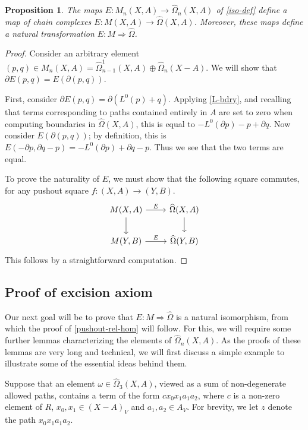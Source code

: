 \documentclass[11pt]{article}
\newtheorem{proposition}[theo]{Proposition}
\theoremstyle{definition}
\numberwithin{equation}{section}
\newcommand{\tOmega}{\widehat{\Omega}}
\newcommand{\tOmegaOne}{\widehat{\Omega}^1}
\newcommand{\bd}{\partial}
\begin{document}
\begin{proposition}\label{iso-pres-bdry}
The maps $E \colon M_n(X,A) \to \tOmega_n(X,A)$ of \cref{iso-def} define a map of chain complexes $E \colon M(X,A) \to \tOmega(X,A)$. Moreover, these maps define a natural transformation $E \colon M \Rightarrow \tOmega$.
\end{proposition}

\begin{proof}
Consider an arbitrary element $(p,q) \in M_n(X,A) = \tOmegaOne_{n-1}(X,A) \oplus \tOmega_{n}(X-A)$. We will show that $\bd E(p,q) = E(\bd(p,q))$.

First, consider $\bd E(p,q) = \bd(L^0(p) + q)$. Applying \cref{L-bdry}, and recalling that terms corresponding to paths contained entirely in $A$ are set to zero when computing boundaries in $\tOmega(X,A)$, this is equal to $-L^0(\bd p) - p + \bd q$. Now consider $E(\bd(p,q))$; by definition, this is $E(-\bd p, \bd q - p) = -L^0(\bd p) + \bd q - p$. Thus we see that the two terms are equal.

To prove the naturality of $E$, we must show that the following square commutes, for any pushout square $f \colon (X,A) \to (Y,B)$.
\[
\begin{tikzcd}
M(X,A) \arrow[r,"E"] \arrow[d] & \tOmega(X,A) \arrow[d] \\
M(Y,B) \arrow[r,"E"] & \tOmega(Y,B)
\end{tikzcd}
\]
This follows by a straightforward computation.
\end{proof}

\subsection*{Proof of excision axiom}

Our next goal will be to prove that $E \colon M \Rightarrow \tOmega$ is a natural isomorphism, from which the proof of \cref{pushout-rel-hom} will follow.
For this, we will require some further lemmas characterizing the elements of $\tOmega_n(X,A)$. As the proofs of these lemmas are very long and technical, we will first discuss a simple example to illustrate some of the essential ideas behind them. 

Suppose that an element $\omega \in \tOmega_3(X,A)$, viewed as a sum of non-degenerate allowed paths, contains a term of the form $c x_0 x_1 a_1 a_2$, where $c$ is a non-zero element of $R$, $x_0, x_1 \in (X-A)_V$ and $a_1, a_2 \in A_V$. For brevity, we let $z$ denote the path $x_0 x_1 a_1 a_2$. 
\end{document}
